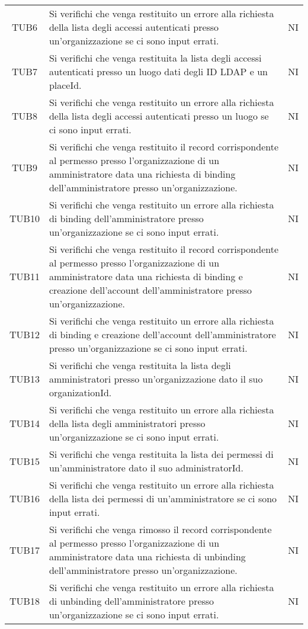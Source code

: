 {\begin{longtable}{ c C{13cm} C{1cm}}
TUB6 & Si verifichi che venga restituito un errore alla richiesta della lista degli accessi autenticati presso un'organizzazione se ci sono input errati. & NI \\
TUB7 & Si verifichi che venga restituita la lista degli accessi autenticati presso un luogo dati degli ID LDAP e un placeId. & NI \\
TUB8 & Si verifichi che venga restituito un errore alla richiesta della lista degli accessi autenticati presso un luogo se ci sono input errati. & NI \\
TUB9 & Si verifichi che venga restituito il record corrispondente al permesso presso l'organizzazione di un amministratore data una richiesta di binding dell'amministratore presso un'organizzazione. & NI \\
TUB10 & Si verifichi che venga restituito un errore alla richiesta di binding dell'amministratore presso un'organizzazione se ci sono input errati. & NI \\
TUB11 & Si verifichi che venga restituito il record corrispondente al permesso presso l'organizzazione di un amministratore data una richiesta di binding e creazione dell'account dell'amministratore presso un'organizzazione. & NI \\
TUB12 & Si verifichi che venga restituito un errore alla richiesta di binding e creazione dell'account dell'amministratore presso un'organizzazione se ci sono input errati. & NI \\
TUB13 & Si verifichi che venga restituita la lista degli amministratori presso un'organizzazione dato il suo organizationId. & NI \\
TUB14 & Si verifichi che venga restituito un errore alla richiesta della lista degli amministratori presso un'organizzazione se ci sono input errati. & NI \\
TUB15 & Si verifichi che venga restituita la lista dei permessi di un'amministratore dato il suo administratorId. & NI \\
TUB16 & Si verifichi che venga restituito un errore alla richiesta della lista dei permessi di un'amministratore  se ci sono input errati. & NI \\
TUB17 & Si verifichi che venga rimosso il record corrispondente al permesso presso l'organizzazione di un amministratore data una richiesta di unbinding dell'amministratore presso un'organizzazione. & NI \\
TUB18 & Si verifichi che venga restituito un errore alla richiesta di unbinding dell'amministratore presso un'organizzazione se ci sono input errati. & NI \\

\end{longtable}}
